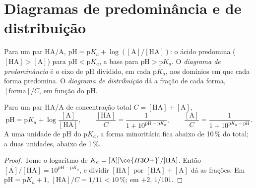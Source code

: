 \section{Diagramas de predominância e de distribuição}

\begin{definition}\label{def:b1:predominant-reaction:predominance}
Para um par HA/A, $\mathrm{pH} = \mathrm{p}K_a + \log([\mathrm{A}]/[\mathrm{HA}])$:
o ácido predomina ($[\mathrm{HA}] > [\mathrm{A}]$) para
$\mathrm{pH} < \mathrm{p}K_a$, a base para $\mathrm{pH} > \mathrm{p}K_a$.
O \emph{diagrama de predominância} é o eixo
de pH dividido, em cada $\mathrm{p}K_a$, nos domínios em que cada forma
predomina. O \emph{diagrama de distribuição}
dá a fração de cada forma, $[\text{forma}]/C$, em função do pH.
\end{definition}

\begin{proposition}\label{prop:b1:predominant-reaction:henderson}
Para um par HA/A de concentração total $C = [\mathrm{HA}] + [\mathrm{A}]$,
\[
  \mathrm{pH} = \mathrm{p}K_a + \log\frac{[\mathrm{A}]}{[\mathrm{HA}]}, \qquad
  \frac{[\mathrm{HA}]}{C} = \frac{1}{1 + 10^{\mathrm{pH} - \mathrm{p}K_a}}, \qquad
  \frac{[\mathrm{A}]}{C} = \frac{1}{1 + 10^{\mathrm{p}K_a - \mathrm{pH}}} .
\]
A uma unidade de pH do $\mathrm{p}K_a$, a forma minoritária fica abaixo
de 10\,\% do total; a duas unidades, abaixo de 1\,\%.
\end{proposition}

\begin{proof}
Tome o logaritmo de $K_a = [\mathrm{A}][\ce{H3O+}]/[\mathrm{HA}]$. Então
$[\mathrm{A}]/[\mathrm{HA}] = 10^{\mathrm{pH}-\mathrm{p}K_a}$, e dividir
$[\mathrm{HA}]$ por $[\mathrm{HA}] + [\mathrm{A}]$ dá as frações. Em
$\mathrm{pH} = \mathrm{p}K_a + 1$, $[\mathrm{HA}]/C = 1/11 < 10\,\%$; em
$+2$, $1/101$.
\end{proof}


